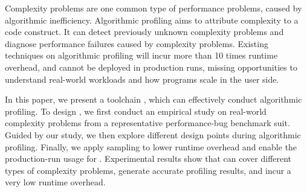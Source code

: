 Complexity problems are one common type of performance problems, 
caused by algorithmic inefficiency. 
Algorithmic profiling aims to attribute complexity to a code construct.
It can detect previously unknown complexity problems and diagnose performance failures 
caused by complexity problems. 
Existing techniques on algorithmic profiling 
will incur more than 10 times runtime overhead,
and cannot be deployed in production runs, missing opportunities to understand 
real-world workloads and how programs scale in the user side. 

In this paper, we present a toolchain \Tool, 
which can effectively conduct algorithmic profiling. 
To design \Tool, we first conduct an empirical study on 
real-world complexity problems from a representative performance-bug benchmark suit. 
Guided by our study, 
we then explore different 
design points during algorithmic profiling.
Finally, we apply sampling to lower runtime 
overhead and enable the production-run usage for \Tool.
Experimental results show that \Tool 
can cover different types of complexity problems, 
generate accurate profiling results, 
and incur a very low runtime overhead. 


